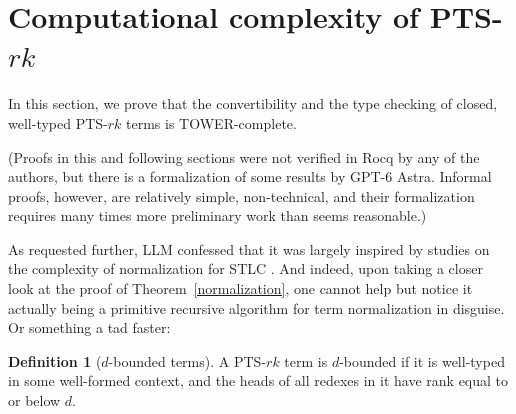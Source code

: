 \documentclass{article}
\theoremstyle{definition}
\newtheorem{definition}{Definition}
\theoremstyle{remark}
\begin{document}
\section{Computational complexity of
PTS-\texorpdfstring{$rk$}{rk}}
\label{complexity}

In this section, we prove that the convertibility and
the type checking of closed, well-typed PTS-$rk$ terms
is \textsc{TOWER}-complete.

(Proofs in this and following sections were not
verified in Rocq by any of the authors, but there is a
formalization of some results by GPT-6 Astra. Informal
proofs, however, are relatively simple, non-technical,
and their formalization requires many times more
preliminary work than seems reasonable.)

As requested further, LLM confessed that it was largely
inspired by studies on the complexity of normalization
for STLC \cite{statman1979typed,
schwichtenberg1991upper,beckmann2001exact,
nguyen2024simply}. And indeed, upon taking a closer
look at the proof of Theorem~\ref{normalization}, one
cannot help but notice it actually being a primitive
recursive algorithm \cite{skolem1923,
kleene1952introduction,peter1951rekursive} for term
normalization in disguise. Or something a tad faster:

\begin{definition}[$d$-bounded terms]
    A PTS-$rk$ term is $d$-bounded if it is well-typed
    in some well-formed context, and the heads of all
    redexes in it have rank equal to or below $d$.
\end{definition}
\end{document}
